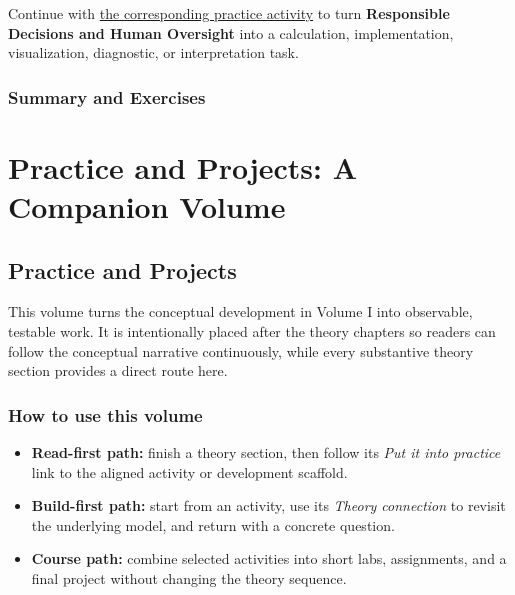 \documentclass[
  letterpaper,
]{scrbook}
\providecommand{\tightlist}{%
  \setlength{\itemsep}{0pt}\setlength{\parskip}{0pt}}
\begin{document}
\begin{tcolorbox}[enhanced jigsaw, arc=.35mm, bottomrule=.15mm, bottomtitle=1mm, breakable, colback=white, colbacktitle=quarto-callout-tip-color!10!white, colframe=quarto-callout-tip-color-frame, coltitle=black, left=2mm, leftrule=.75mm, opacityback=0, opacitybacktitle=0.6, rightrule=.15mm, title=\textcolor{quarto-callout-tip-color}{\faLightbulb}\hspace{0.5em}{Put it into practice}, titlerule=0mm, toprule=.15mm, toptitle=1mm]

Continue with
\hyperref[sec-pr-16-responsible-decisions-and-human-oversight]{the
corresponding practice activity} to turn \textbf{Responsible Decisions
and Human Oversight} into a calculation, implementation, visualization,
diagnostic, or interpretation task.

\end{tcolorbox}

\section{Summary and Exercises}\label{summary-and-exercises-1}

\part{Practice and Projects: A Companion Volume}

\chapter*{Practice and Projects}\label{ch-practice}


This volume turns the conceptual development in Volume I into
observable, testable work. It is intentionally placed after the theory
chapters so readers can follow the conceptual narrative continuously,
while every substantive theory section provides a direct route here.

\section*{How to use this volume}\label{how-to-use-this-volume}


\begin{itemize}
\tightlist
\item
  \textbf{Read-first path:} finish a theory section, then follow its
  \emph{Put it into practice} link to the aligned activity or
  development scaffold.
\item
  \textbf{Build-first path:} start from an activity, use its
  \emph{Theory connection} to revisit the underlying model, and return
  with a concrete question.
\item
  \textbf{Course path:} combine selected activities into short labs,
  assignments, and a final project without changing the theory sequence.
\end{itemize}
\end{document}
